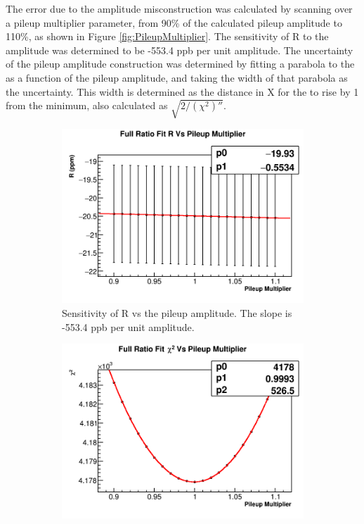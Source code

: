 		The error due to the amplitude misconstruction was calculated by scanning over a pileup multiplier parameter, from 90\% of the calculated pileup amplitude to 110\%, as shown in Figure \ref{fig:PileupMultiplier}. The sensitivity of R to the amplitude was determined to be -553.4 ppb per unit amplitude. The uncertainty of the pileup amplitude construction was determined by fitting a parabola to the \chisq as a function of the pileup amplitude, and taking the width of that parabola as the uncertainty. This width is determined as the distance in X for the \chisq to rise by 1 from the minimum, also calculated as $\sqrt{2/(\chi^{2})''}$.

		\begin{figure}[h]
		\centering
		    \begin{subfigure}[t]{0.45\textwidth}
			    \centering
				\includegraphics[width=\textwidth]{RatioCBO_R_Vs_PileupMultiplier_Canv}
			    \caption{Sensitivity of R vs the pileup amplitude. The slope is -553.4 ppb per unit amplitude.}
		    \end{subfigure}
		    \hspace{4mm}
		    \begin{subfigure}[t]{0.45\textwidth}
			    \centering
				\includegraphics[width=\textwidth]{RatioCBO_Chi2_Vs_PileupMultiplier_Canv}

\end{subfigure}
\end{figure}
